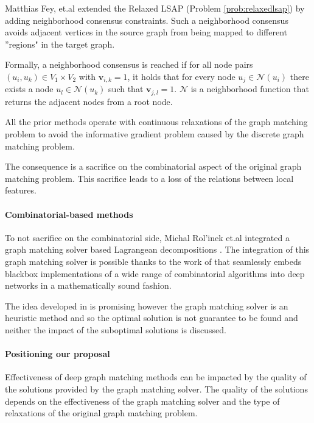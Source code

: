 \documentclass[times,onecolumn,final,authoryear]{article}
\theoremstyle{definition}
\begin{document}
Matthias Fey, et.al\cite{DGMC} extended the Relaxed LSAP (Problem \ref{prob:relaxedlsap}) by adding neighborhood consensus constraints. Such a neighborhood consensus avoids adjacent vertices in the source graph from being mapped to different ''regions" in the target graph. 

Formally, a neighborhood consensus is reached if for all node pairs $(u_i, u_k) \in V_1 \times V_2$ with $\textbf{v}_{i,k}=1$, it holds that for every node $u_j \in \mathcal{N}(u_i)$ there exists a node $u_l \in \mathcal{N}(u_k)$ such that $\textbf{v}_{j,l}=1$. $\mathcal{N}$ is a neighborhood function that returns the adjacent nodes from a root node.


All the prior methods operate with continuous relaxations of the graph matching problem to avoid the informative gradient problem caused by the discrete graph matching problem. 

The consequence is a sacrifice on the combinatorial aspect of the original graph matching problem. This sacrifice leads to a loss of the relations between local features.



\paragraph{Combinatorial-based methods}
To not sacrifice on the combinatorial side, Michal Rol'inek et.al\cite{BB-GM} integrated a graph matching solver based Lagrangean decompositions \cite{DBLP:journals/corr/SwobodaRAKS16}. The integration of this graph matching solver is possible thanks to the work of \cite{DBLP:journals/corr/abs-1912-02175} that seamlessly embeds blackbox implementations of a wide range of combinatorial algorithms into deep networks in a mathematically sound fashion.

The idea developed in \cite{BB-GM} is promising however the graph matching solver is an heuristic method and so the optimal solution is not guarantee to be found and neither the impact of the suboptimal solutions is discussed.


\paragraph{Positioning our proposal}
Effectiveness of deep graph matching methods can be impacted by the quality of the solutions provided by the graph matching solver. The quality of the solutions depends on the effectiveness of the graph matching solver and the type of relaxations of the original graph matching problem.
\end{document}
